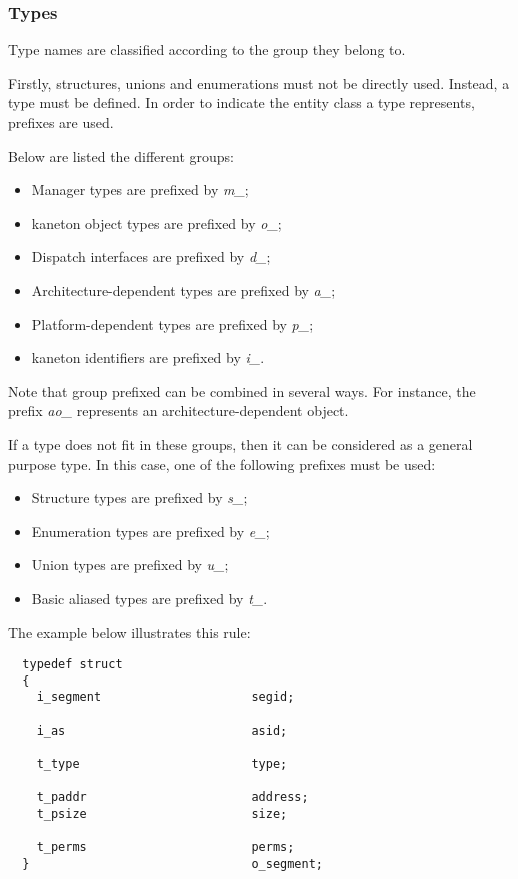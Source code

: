 
\subsubsection{Types}

Type names are classified according to the group they belong to.

Firstly, structures, unions and enumerations must not be directly used.
Instead, a type must be defined. In order to indicate the entity class a type
represents, prefixes are used.

Below are listed the different groups:

\begin{itemize}
  \item
    Manager types are prefixed by \textit{m\_};
  \item
    kaneton object types are prefixed by \textit{o\_};
  \item
    Dispatch interfaces are prefixed by \textit{d\_};
  \item
    Architecture-dependent types are prefixed by \textit{a\_};
  \item
    Platform-dependent types are prefixed by \textit{p\_};
  \item
    kaneton identifiers are prefixed by \textit{i\_}.
\end{itemize}

Note that group prefixed can be combined in several ways. For instance,
the prefix \textit{ao\_} represents an architecture-dependent object.

If a type does not fit in these groups, then it can be considered as a
general purpose type. In this case, one of the following prefixes must be used:

\begin{itemize}
  \item
    Structure types are prefixed by \textit{s\_};
  \item
    Enumeration types are prefixed by \textit{e\_};
  \item
    Union types are prefixed by \textit{u\_};
  \item
    Basic aliased types are prefixed by \textit{t\_}.
\end{itemize}

The example below illustrates this rule:

\begin{verbatim}
  typedef struct
  {
    i_segment                     segid;

    i_as                          asid;

    t_type                        type;

    t_paddr                       address;
    t_psize                       size;

    t_perms                       perms;
  }                               o_segment;
\end{verbatim}


